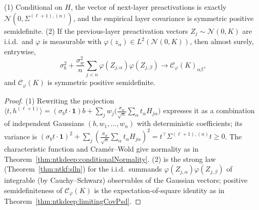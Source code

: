 \begin{theorem}\label{thm:ntkdeep:sequential}
  \leanok
(1) Conditional on $H$, the vector of next-layer preactivations is exactly $\mathcal N(0,\Sigma^{(\ell+1),(n)})$, and the empirical layer covariance is symmetric positive semidefinite.
(2) If the previous-layer preactivation vectors $Z_j\sim\mathcal N(0,K)$ are i.i.d.\ and $\varphi$ is measurable with $\varphi(z_\alpha)\in L^2(\mathcal N(0,K))$, then almost surely, entrywise,
\[
  \sigma_b^2+\frac{\sigma_w^2}n\sum_{j<n}\varphi(Z_{j,\alpha})\varphi(Z_{j,\beta})\longrightarrow\mathcal C_\varphi(K)_{\alpha\beta},
\]
and $\mathcal C_\varphi(K)$ is symmetric positive semidefinite.
\end{theorem}

\begin{proof}
  \leanok
(1) Rewriting the projection $\langle t,h^{(\ell+1)}\rangle=(\sigma_bt\cdot\mathbf 1)b+\sum_jw_j\bigl(\frac{\sigma_w}{\sqrt n}\sum_\alpha t_\alpha H_{j\alpha}\bigr)$ expresses it as a combination of independent Gaussians $(b,w_1,\dots,w_n)$ with deterministic coefficients; its variance is
$(\sigma_bt\cdot\mathbf 1)^2+\sum_j(\frac{\sigma_w}{\sqrt n}\sum_\alpha t_\alpha H_{j\alpha})^2=t^\top\Sigma^{(\ell+1),(n)}t\ge0$. The characteristic function and Cram\'er--Wold give normality as in Theorem~\ref{thm:ntkdeep:conditionalNormality}.
(2) is the strong law (Theorem~\ref{thm:ntkf:slln}) for the i.i.d.\ summands $\varphi(Z_{j,\alpha})\varphi(Z_{j,\beta})$ of integrable (by Cauchy--Schwarz) observables of the Gaussian vectors; positive semidefiniteness of $\mathcal C_\varphi(K)$ is the expectation-of-square identity as in Theorem~\ref{thm:ntkdeep:limitingCovPsd}.
\end{proof}

